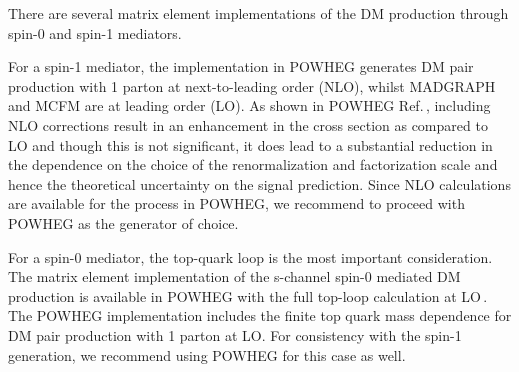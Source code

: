 

There are several matrix element implementations of the
DM production through spin-0 and spin-1 mediators.

For a spin-1 mediator, the implementation in POWHEG generates
DM pair production with 1 parton at next-to-leading order (NLO), whilst MADGRAPH and MCFM are at leading order (LO). As shown in POWHEG Ref.\,\cite{Haisch:2013ata}, including NLO corrections result in an enhancement in the cross section as compared to LO and though this is not significant, it does lead to a substantial reduction in the dependence on the choice of the renormalization and factorization scale and hence the theoretical uncertainty on the signal prediction. 
Since NLO calculations are available for the process in POWHEG, we recommend to proceed with POWHEG as the generator of choice. 

For a spin-0 mediator, the top-quark loop is the most important
consideration.
The matrix element implementation of the s-channel spin-0 mediated DM production is available in POWHEG with the full top-loop calculation at LO\,\cite{Haisch:2015ioa}.
The POWHEG implementation includes the finite
top quark mass dependence for DM pair production with 1 parton at LO.
For consistency with the spin-1 generation, we recommend using POWHEG
for this case as well.


